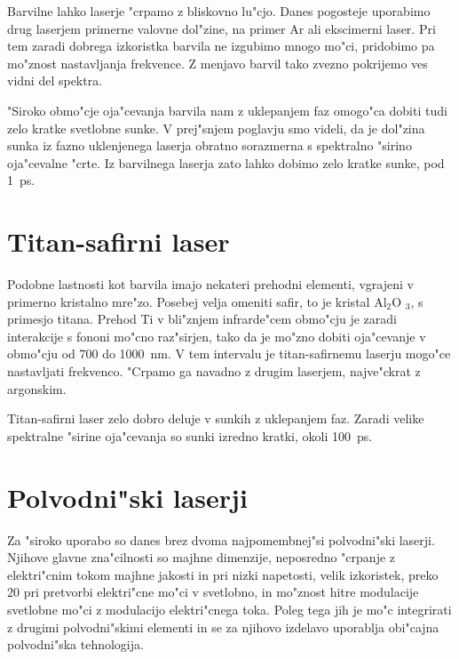 Barvilne lahko laserje "crpamo z bliskovno lu"cjo. Danes pogosteje uporabimo
drug laserjem primerne valovne dol"zine, na primer Ar ali ekscimerni laser.
Pri tem zaradi dobrega izkoristka barvila ne izgubimo mnogo mo"ci, pridobimo
pa mo"znost nastavljanja frekvence. Z menjavo barvil tako zvezno pokrijemo
ves vidni del spektra.

"Siroko obmo"cje oja"cevanja barvila nam z uklepanjem faz omogo"ca dobiti
tudi zelo kratke svetlobne sunke. V prej"snjem poglavju smo videli, da je
dol"zina sunka iz fazno uklenjenega laserja obratno sorazmerna s spektralno
"sirino oja"cevalne "crte. Iz barvilnega laserja zato lahko dobimo zelo
kratke sunke, pod 1~ps.

\section{Titan-safirni laser}

Podobne lastnosti kot barvila imajo nekateri prehodni elementi, vgrajeni v
primerno kristalno mre"zo. Posebej velja omeniti safir, to je kristal Al$_2$O%
$_3$, s primesjo titana. Prehod Ti v bli"znjem infrarde"cem obmo"cju je
zaradi interakcije s fononi mo"cno raz"sirjen, tako da je mo"zno dobiti
oja"cevanje v obmo"cju od 700 do 1000~nm. V tem intervalu je titan-safirnemu
laserju mogo"ce nastavljati frekvenco. "Crpamo ga navadno z drugim laserjem,
najve"ckrat z argonskim.

Titan-safirni laser zelo dobro deluje v sunkih z uklepanjem faz. Zaradi
velike spektralne "sirine oja"cevanja so sunki izredno kratki, okoli 100~ps.

\section{Polvodni"ski laserji}

Za "siroko uporabo so danes brez dvoma najpomembnej"si polvodni"ski laserji.
Njihove glavne zna"cilnosti so majhne dimenzije, neposredno "crpanje z
elektri"cnim tokom majhne jakosti in pri nizki napetosti, velik izkoristek,
preko 20%
pri pretvorbi elektri"cne mo"ci v svetlobno, in mo"znost hitre modulacije
svetlobne mo"ci z modulacijo elektri"cnega toka. Poleg tega jih je mo"c
integrirati z drugimi polvodni"skimi elementi in se za njihovo izdelavo
uporablja obi"cajna polvodni"ska tehnologija.

